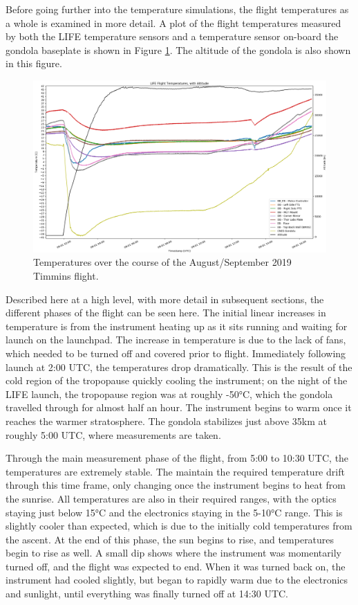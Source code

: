 Before going further into the temperature simulations, the flight temperatures as a whole is examined in more detail. A plot of the flight temperatures measured by both the LIFE temperature sensors and a temperature sensor on-board the gondola baseplate is shown in Figure \ref{fig:full_temps_no_sims}. The altitude of the gondola is also shown in this figure.

\begin{figure}
    \centering
    \includegraphics[width=\textwidth]{chap4_images/full_flight_no_sim_temps.png}
    \caption{Temperatures over the course of the August/September 2019 Timmins flight.}
    \label{fig:full_temps_no_sims}
\end{figure}

Described here at a high level, with more detail in subsequent sections, the different phases of the flight can be seen here. The initial linear increases in temperature is from the instrument heating up as it sits running and waiting for launch on the launchpad. The increase in temperature is due to the lack of fans, which needed to be turned off and covered prior to flight. Immediately following launch at 2:00 UTC, the temperatures drop dramatically. This is the result of the cold region of the tropopause quickly cooling the instrument; on the night of the LIFE launch, the tropopause region was at roughly -50°C, which the gondola travelled through for almost half an hour. The instrument begins to warm once it reaches the warmer stratosphere. The gondola stabilizes just above 35km at roughly 5:00 UTC, where measurements are taken.

Through the main measurement phase of the flight, from 5:00 to 10:30 UTC, the temperatures are extremely stable. The maintain the required temperature drift through this time frame, only changing once the instrument begins to heat from the sunrise. All temperatures are also in their required ranges, with the optics staying just below 15°C and the electronics staying in the 5-10°C range. This is slightly cooler than expected, which is due to the initially cold temperatures from the ascent. At the end of this phase, the sun begins to rise, and temperatures begin to rise as well. A small dip shows where the instrument was momentarily turned off, and the flight was expected to end. When it was turned back on, the instrument had cooled slightly, but began to rapidly warm due to the electronics and sunlight, until everything was finally turned off at 14:30 UTC. 

